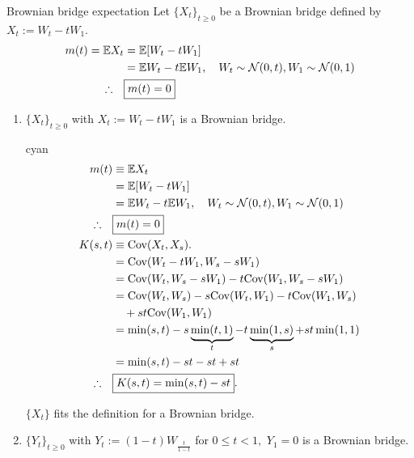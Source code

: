 	\begin{fact}{Brownian bridge expectation}{}
	Let $\{X_t\}_{t\geq 0}$ be a Brownian bridge defined by $X_t:= W_t - tW_1$.
	\begin{align*}
	m(t) = \mathbb{E} X_t 
		&= \mathbb{E}[W_t - tW_1] \\
		&= \mathbb{E} W_t - t\mathbb{E} W_1 , \quad W_t\sim\mathcal{N}(0, t), 
			W_1 \sim \mathcal{N}(0, 1)\\
	\therefore\quad & \boxed{ m(t) =  0 } \\
	\end{align*}
	\end{fact}


\begin{enumerate}[label=(\roman*)] 
\item %
$\{X_t\}_{t\geq 0}$ with $X_t:= W_t - tW_1$ is a Brownian bridge.

\begin{mybox}{cyan}{}
\begin{align*}
m(t) &\equiv \mathbb{E} X_t  \\
	&= \mathbb{E}[W_t - tW_1] \\
	&= \mathbb{E} W_t - t\mathbb{E} W_1 , \quad W_t\sim\mathcal{N}(0, t), 
		W_1 \sim \mathcal{N}(0, 1)\\
\therefore\quad & \boxed{ m(t) =  0 } \\
K(s,t) &\equiv \text{Cov}(X_t, X_s). \\
	&= \text{Cov}(W_t - tW_1, W_s - sW_1) \\
	&= \text{Cov}(W_t, W_s - sW_1) -t\text{Cov}(W_1, W_s - s W_1) \\
	&= \text{Cov}(W_t, W_s) -s\text{Cov}(W_t, W_1) 
		-t\text{Cov}(W_1, W_s) \\ &\quad  + st\text{Cov}(W_1, W_1) \\
	&= \min(s,t) - s\underbrace{\min(t, 1)}_{t} 
		- t \underbrace{\min(1, s)}_{s} + st\min(1, 1) \\
	&= \min(s, t) - st - st + st \\
\therefore\quad& \boxed{ K(s, t) = \min(s, t) - st }.
\end{align*}

$\{X_t\}$ fits the definition for a Brownian bridge. 
\end{mybox} %

\item %
$\{Y_t\}_{t\geq 0 }$ with $Y_t := (1- t) W_{\frac{t}{1-t}}$ for $0\leq t < 1,$ $Y_1 = 0$ is a Brownian bridge.


\end{enumerate}
